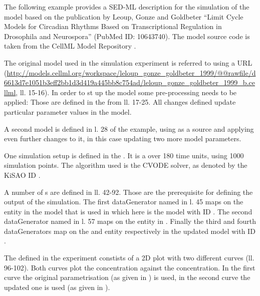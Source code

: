 The following example provides a SED-ML description for the simulation of the model based on the publication by Leoup, Gonze and Goldbeter ``Limit Cycle Models for Circadian Rhythms Based on Transcriptional Regulation in Drosophila and Neurospora'' (PubMed ID: 10643740).
The model source code is taken from the CellML Model Repository \citep{LLH+08}. 

The original model used in the simulation experiment is referred to using a URL (\url{http://models.cellml.org/workspace/leloup_gonze_goldbeter_1999/@@rawfile/d6613d7e1051b3eff2bb1d3d419a445bb8c754ad/leloup_gonze_goldbeter_1999_b.cellml}, ll. 15-16).
In order to st up the model some pre-processing needs to be applied: Those are defined in the  from ll. 17-25. All changes defined update particular parameter values in the model.

A second model is defined in l. 28 of the example, using  as a source and applying even further changes to it, in this case updating two more model parameters.

One simulation setup is defined in the . It is a  over 180 time units, using 1000 simulation points. The algorithm used is the CVODE solver, as denoted by the KiSAO ID .

A number of s are defined in ll. 42-92. Those are the prerequisite for defining the output of the simulation. The first dataGenerator named  in l. 45 maps on the  entity in the model that is used in  which here is the model with ID . The second dataGenerator named  in l. 57 maps on the  entity in . Finally  the third and fourth dataGenerators map on the  and  entity respectively in the updated model with ID .

The  defined in the experiment constists of a 2D plot with two different curves (ll. 96-102). Both curves plot the  concentration against the  concentration. In the first curve the original parametrisation (as given in ) is used, in the second curve the updated one is used (as given in ).

